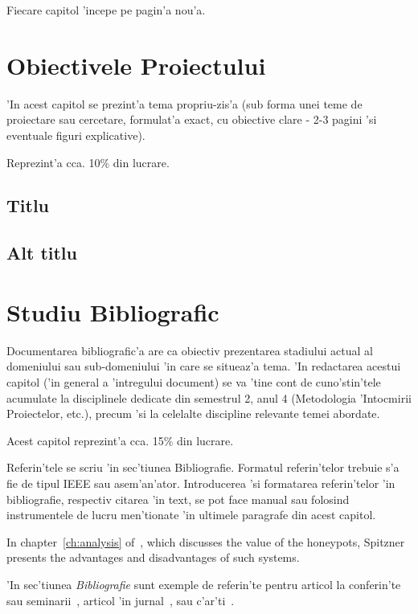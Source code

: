 \documentclass[12pt,a4paper,twoside]{report}
\begin{document}
Fiecare capitol 'incepe pe pagin'a nou'a.

\chapter{Obiectivele Proiectului}

'In acest capitol se prezint'a tema propriu-zis'a (sub forma unei teme de proiectare sau cercetare, formulat'a exact, cu obiective clare - 2-3 pagini 'si eventuale figuri explicative).

Reprezint'a cca. 10\% din lucrare.
\section{Titlu}
\section{Alt titlu}


\chapter{Studiu Bibliografic}

Documentarea bibliografic'a are ca obiectiv prezentarea stadiului actual al domeniului sau sub-domeniului 'in care se situeaz'a tema. 
'In redactarea acestui capitol ('in general a 'intregului document) se va 'tine cont de cuno'stin'tele acumulate la disciplinele dedicate din semestrul 2, anul 4 
(Metodologia 'Intocmirii Proiectelor, etc.), precum 'si la celelalte discipline relevante temei abordate.

Acest capitol reprezint'a cca. 15\% din lucrare.

Referin'tele se scriu 'in sec'tiunea Bibliografie. 
Formatul referin'telor trebuie s'a fie de tipul IEEE sau asem'an'ator. 
Introducerea 'si formatarea referin'telor 'in bibliografie, respectiv citarea 'in text, se pot face manual sau folosind instrumentele de lucru men'tionate 'in ultimele paragrafe din acest capitol.




In chapter~\ref{ch:analysis} of~\cite{strunk}, which discusses the value of the honeypots, Spitzner presents the advantages and disadvantages of such systems. 


'In sec'tiunea {\it Bibliografie} sunt exemple de referin'te pentru articol la conferin'te sau seminarii~\cite{BellucciLZ04}, articol 'in jurnal~\cite{AntoniouSBDB07}, 
sau c'ar'ti~\cite{russell1995artificial}. 
\end{document}
